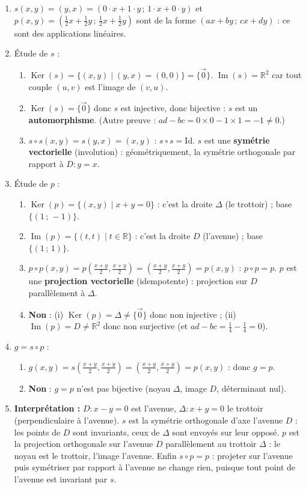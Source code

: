 \documentclass[11pt]{article}
\begin{document}
\begin{corrige}
\begin{enumerate}
\item $s(x,y)=(y,x)=(0\cdot x+1\cdot y\,;\,1\cdot x+0\cdot y)$ et $p(x,y)=\left(\tfrac12 x+\tfrac12 y\,;\,\tfrac12 x+\tfrac12 y\right)$ sont de la forme $(ax+by\,;\,cx+dy)$ : ce sont des applications linéaires.
\item Étude de $s$ :
\begin{enumerate}
\item $\operatorname{Ker}(s)=\{(x,y)\mid (y,x)=(0,0)\}=\{\vec{0}\}$. $\operatorname{Im}(s)=\mathbb{R}^2$ car tout couple $(u,v)$ est l'image de $(v,u)$.
\item $\operatorname{Ker}(s)=\{\vec{0}\}$ donc $s$ est injective, donc bijective : $s$ est un \textbf{automorphisme}. (Autre preuve : $ad-bc=0\times 0-1\times 1=-1\neq 0$.)
\item $s\circ s(x,y)=s(y,x)=(x,y)$ : $s\circ s=\mathrm{Id}$. $s$ est une \textbf{symétrie vectorielle} (involution) : géométriquement, la symétrie orthogonale par rapport à $D:y=x$.
\end{enumerate}
\item Étude de $p$ :
\begin{enumerate}
\item $\operatorname{Ker}(p)=\{(x,y)\mid x+y=0\}$ : c'est la droite $\Delta$ (le trottoir) ; base $\{(1\,;\,-1)\}$.
\item $\operatorname{Im}(p)=\{(t,t)\mid t\in\mathbb{R}\}$ : c'est la droite $D$ (l'avenue) ; base $\{(1\,;\,1)\}$.
\item $p\circ p(x,y)=p\left(\tfrac{x+y}{2},\tfrac{x+y}{2}\right)=\left(\tfrac{x+y}{2},\tfrac{x+y}{2}\right)=p(x,y)$ : $p\circ p=p$. $p$ est une \textbf{projection vectorielle} (idempotente) : projection sur $D$ parallèlement à $\Delta$.
\item \textbf{Non} : (i) $\operatorname{Ker}(p)=\Delta\neq\{\vec{0}\}$ donc non injective ; (ii) $\operatorname{Im}(p)=D\neq\mathbb{R}^2$ donc non surjective (et $ad-bc=\tfrac14-\tfrac14=0$).
\end{enumerate}
\item $g=s\circ p$ :
\begin{enumerate}
\item $g(x,y)=s\left(\tfrac{x+y}{2},\tfrac{x+y}{2}\right)=\left(\tfrac{x+y}{2},\tfrac{x+y}{2}\right)=p(x,y)$ : donc $g=p$.
\item \textbf{Non} : $g=p$ n'est pas bijective (noyau $\Delta$, image $D$, déterminant nul).
\end{enumerate}
\item \textbf{Interprétation :} $D:x-y=0$ est l'avenue, $\Delta:x+y=0$ le trottoir (perpendiculaire à l'avenue). $s$ est la symétrie orthogonale d'axe l'avenue $D$ : les points de $D$ sont invariants, ceux de $\Delta$ sont envoyés sur leur opposé. $p$ est la projection orthogonale sur l'avenue $D$ parallèlement au trottoir $\Delta$ : le noyau est le trottoir, l'image l'avenue. Enfin $s\circ p=p$ : projeter sur l'avenue puis symétriser par rapport à l'avenue ne change rien, puisque tout point de l'avenue est invariant par $s$.
\end{enumerate}


\end{corrige}
\end{document}
